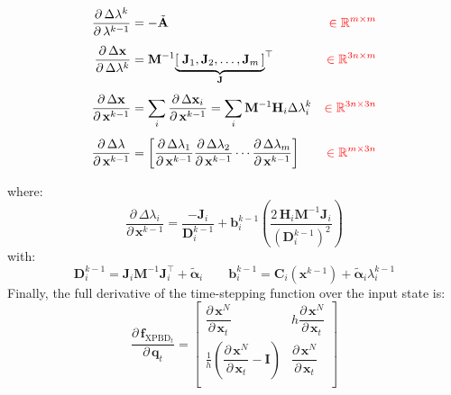 \documentclass{article}
\newcommand{\pd}[2]{\dfrac{\partial\, #1}{\partial\, #2}}
\newcommand{\red}[1]{\textcolor{red}{#1}}
\begin{document}
\begin{equation}
\begin{aligned}
\label{eq:diffXPBD:explicit:four_analytical_derivatives}
\pd{\Delta\lambda^k}{\lambda^{k-1}} &= 
    -\tilde{\mathbf{A}}
    & \red{\in \mathbb{R}^{m \times m}}
\\[1ex]
\pd{\Delta\mathbf{x}}{\Delta\lambda^k} &= 
    \mathbf{M}^{-1}
    {\underbrace{[\;\mathbf{J}_1, \mathbf{J}_2, \dots, \mathbf{J}_m\,]}_{\mathbf{J}}}^\top
    & \red{\in \mathbb{R}^{3n \times m}}
\\[1ex]
\pd{\Delta\mathbf{x}}{\mathbf{x}^{k-1}} &= 
    \sum_i \pd{\Delta\mathbf{x}_i}{\mathbf{x}^{k-1}} =
    \sum_i  \mathbf{M}^{-1}  \mathbf{H}_i \Delta \lambda_i^k
    & \red{\in \mathbb{R}^{3n \times 3n}}
\\[1ex]
\pd{\Delta\lambda}{\mathbf{x}^{k-1}} &= 
    \left[ 
        \pd{\Delta\lambda_1}{\mathbf{x}^{k-1}}  
        \pd{\Delta\lambda_2}{\mathbf{x}^{k-1}}
        \cdots
        \pd{\Delta\lambda_m}{\mathbf{x}^{k-1}}
    \right]
    & \red{\in \mathbb{R}^{m \times 3n}}
\\[1ex]
\end{aligned}    
\end{equation}
where:
\begin{equation}
\label{eq:diffXPBD:explicit:d_delta_lambda_d_x}
\pd{\Delta\lambda_i}{\mathbf{x}^{k-1}} = 
\dfrac
    {- \mathbf{J}_i}
    {\mathbf{D}_i^{k-1}} +
\mathbf{b}_i^{k-1}
\left(
    \dfrac
    {2\, \mathbf{H}_i\mathbf{M}^{-1}\mathbf{J}_i}
    {(\mathbf{D}_i^{k-1})^2}
\right)
\end{equation}
with:
\begin{equation*}
\mathbf{D}_i^{k-1} = 
    \mathbf{J}_i\mathbf{M}^{-1}\mathbf{J}_i^\top + \tilde{\boldsymbol{\alpha}}_{i}
\qquad
\mathbf{b}_i^{k-1} = 
    \mathbf{C}_i(\mathbf{x}^{k-1}) + \tilde{\boldsymbol{\alpha}}_{i}\lambda^{k-1}_i
\end{equation*}
Finally, the full derivative of the time-stepping function over the input state is:
\begin{equation}
    \pd{\mathbf{f}_{\text{XPBD}_t}}{\mathbf{q}_t} = 
    \begin{bmatrix}
        \displaystyle \pd{\mathbf{x}^N}{\mathbf{x}_t} &
        \displaystyle h\pd{\mathbf{x}^N}{\mathbf{x}_t}
        \\[3ex]
        \displaystyle \frac{1}{h}\left(\pd{\mathbf{x}^N}{\mathbf{x}_t} - \mathbf{I}\right) &
        \displaystyle \pd{\mathbf{x}^N}{\mathbf{x}_t}
        \\[1ex]
    \end{bmatrix}
\end{equation}
\end{document}

